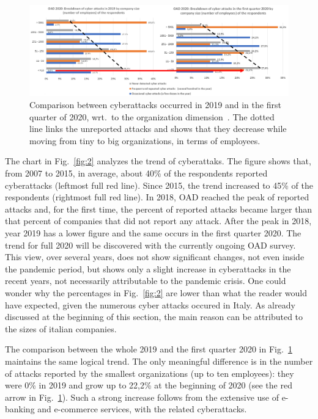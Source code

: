 \documentclass{easychair}
\begin{document}
\begin{figure}
	\begin{center}
		\includegraphics[scale=0.52]{pictures/fig3.png}
	\end{center}
  \caption{Comparison between cyberattacks occurred in 2019 and in the first quarter of 2020,
    wrt.\ to the organization dimension~\cite{oad20}. The dotted line links
    the unreported attacks and shows that they decrease while moving from tiny to big organizations,
    in terms of employees.}
  \label{fig:3}
\end{figure}

The chart in Fig.~\ref{fig:2} analyzes the trend of cyberattaks.
The figure shows that, from 2007 to 2015, in average, about 40\% of the respondents
reported cyberattacks (leftmost full red line). Since 2015, the trend increased to 45\%
of the respondents (rightmost full red line). 
In 2018, OAD reached the peak of reported attacks and, for the first time, the percent of
reported attacks became larger than that percent of companies that did not report any attack.
After the peak 
in 2018, year 2019 has a lower figure and the same occurs in the first quarter 2020.
The trend for full 2020 will be discovered with the currently ongoing OAD survey.
This view, over several years, does not show significant changes, not even inside
the pandemic period, but shows only a slight increase in cyberattacks 
in the recent years, not necessarily attributable to the pandemic crisis. One could wonder
why the percentages in Fig.~\ref{fig:2} are lower than what the reader would have expected, 
given the numerous cyber attacks occured in Italy. As already discussed at the beginning of 
this section, the main reason can be attributed to the sizes of italian companies.

The comparison between the whole 2019 and the first quarter 2020
in Fig.~\ref{fig:3} maintains the same logical trend. The only meaningful difference
is in the number of attacks reported by the smallest
organizations (up to ten employees): they were 0\% in 2019 and grow up to
22,2\% at the beginning of 2020 (see the red arrow in Fig.~\ref{fig:3}).
Such a strong increase follows from the extensive use of e-banking and 
e-commerce services, with the related cyberattacks.
\end{document}
